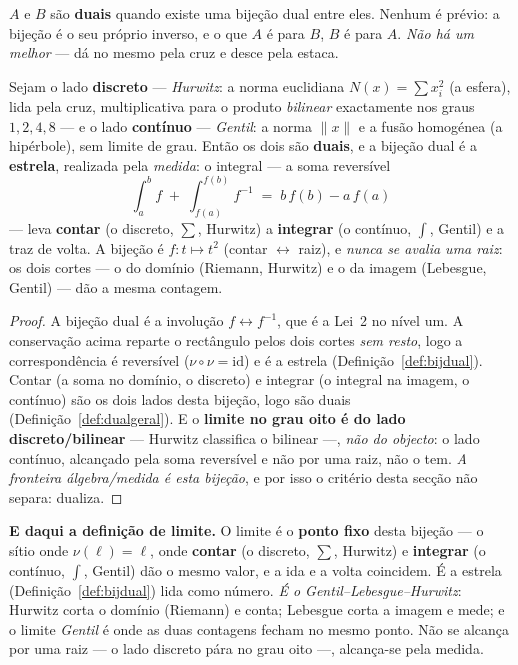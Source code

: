 \documentclass[livro.tex]{subfiles}
\begin{document}
\begin{definicao}[dual]\label{def:dualgeral}
$A$ e $B$ são \textbf{duais} quando existe uma bijeção dual entre eles. Nenhum é prévio: a bijeção é o
seu próprio inverso, e o que $A$ é para $B$, $B$ é para $A$. \emph{Não há um melhor} --- dá no mesmo
pela cruz e desce pela estaca.
\end{definicao}

\begin{teorema}\label{thm:central}
Sejam o lado \textbf{discreto} --- \emph{Hurwitz}: a norma euclidiana $N(x)=\sum x_i^2$ (a esfera),
lida pela cruz, multiplicativa para o produto \emph{bilinear} exactamente nos graus $1,2,4,8$ --- e o
lado \textbf{contínuo} --- \emph{Gentil}: a norma $\|x\|$ e a fusão homogénea (a hipérbole), sem limite
de grau. Então os dois são \textbf{duais}, e a bijeção dual é a \textbf{estrela}, realizada pela
\emph{medida}: o integral --- a soma reversível
\[
  \int_a^b f \;+\; \int_{f(a)}^{f(b)} f^{-1} \;=\; b\,f(b)-a\,f(a)
\]
--- leva \textbf{contar} (o discreto, $\sum$, Hurwitz) a \textbf{integrar} (o contínuo, $\int$, Gentil)
e a traz de volta. A bijeção é $f:t\mapsto t^2$ (contar $\leftrightarrow$ raiz), e \emph{nunca se avalia
uma raiz}: os dois cortes --- o do domínio (Riemann, Hurwitz) e o da imagem (Lebesgue, Gentil) --- dão
a mesma contagem.
\end{teorema}

\begin{proof}
A bijeção dual é a involução $f\leftrightarrow f^{-1}$, que é a Lei~2 no nível um. A conservação acima
reparte o rectângulo pelos dois cortes \emph{sem resto}, logo a correspondência é reversível
($\nu\circ\nu=\mathrm{id}$) e é a estrela (Definição~\ref{def:bijdual}). Contar (a soma no domínio, o
discreto) e integrar (o integral na imagem, o contínuo) são os dois lados desta bijeção, logo são duais
(Definição~\ref{def:dualgeral}). E o \textbf{limite no grau oito é do lado discreto/bilinear} --- Hurwitz
classifica o bilinear ---, \emph{não do objecto}: o lado contínuo, alcançado pela soma reversível e não
por uma raiz, não o tem. \emph{A fronteira álgebra/medida é esta bijeção}, e por isso o critério desta
secção não separa: dualiza.
\end{proof}

\noindent \textbf{E daqui a definição de limite.} O limite é o \textbf{ponto fixo} desta bijeção ---
o sítio onde $\nu(\ell)=\ell$, onde \textbf{contar} (o discreto, $\sum$, Hurwitz) e \textbf{integrar}
(o contínuo, $\int$, Gentil) dão o mesmo valor, e a ida e a volta coincidem. É a estrela
(Definição~\ref{def:bijdual}) lida como número. \emph{É o Gentil--Lebesgue--Hurwitz}: Hurwitz corta o
domínio (Riemann) e conta; Lebesgue corta a imagem e mede; e o limite \emph{Gentil} é onde as duas
contagens fecham no mesmo ponto. Não se alcança por uma raiz --- o lado discreto pára no grau oito ---,
alcança-se pela medida.
\end{document}
